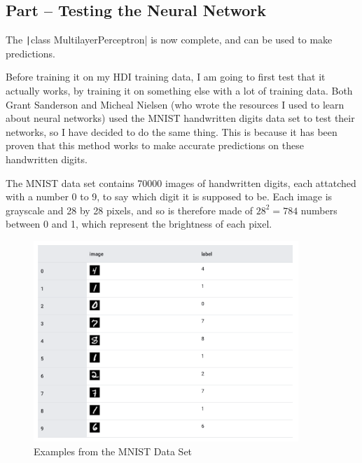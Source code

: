\documentclass[12pt]{report}
\newcommand{\pil}[1]{\protect\texttt|#1|}
\begin{document}
\begin{center}
\end{center}

\subsection{Part \theparts{} -- Testing the Neural Network}\label{sec:testNetwork}

The \pil{class MultilayerPerceptron} is now complete, and can be used to make predictions.

Before training it on my HDI training data, I am going to first test that it actually works, by training it on something else with a lot of training data. Both Grant Sanderson and Micheal Nielsen (who wrote the resources I used to learn about neural networks) used the MNIST handwritten digits data set to test their networks, so I have decided to do the same thing. This is because it has been proven that this method works to make accurate predictions on these handwritten digits.

The MNIST data set contains 70000 images of handwritten digits, each attatched with a number 0 to 9, to say which digit it is supposed to be. Each image is grayscale and 28 by 28 pixels, and so is therefore made of $28^2=784$ numbers between 0 and 1, which represent the brightness of each pixel.

\begin{figure}[H]
\centering
\includegraphics[width=10cm]{mnistExamples.png}
\caption{Examples from the MNIST Data Set}\label{fig:mnistExamples}
\end{figure}
\end{document}
